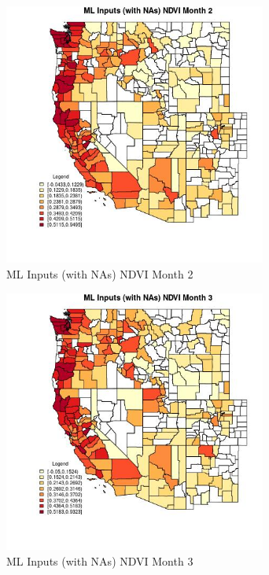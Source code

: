 \begin{figure} 
\centering  
\includegraphics[width=0.77\textwidth]{Code_Outputs/Report_ML_input_PM25_Step4_part_f_de_duplicated_aveswNAs_CountyNDVImedianMonth2.jpg} 
\caption{\label{fig:Report_ML_input_PM25_Step4_part_f_de_duplicated_aveswNAsCountyNDVImedianMonth2}ML Inputs (with NAs) NDVI Month 2} 
\end{figure} 
 

\begin{figure} 
\centering  
\includegraphics[width=0.77\textwidth]{Code_Outputs/Report_ML_input_PM25_Step4_part_f_de_duplicated_aveswNAs_CountyNDVImedianMonth3.jpg} 
\caption{\label{fig:Report_ML_input_PM25_Step4_part_f_de_duplicated_aveswNAsCountyNDVImedianMonth3}ML Inputs (with NAs) NDVI Month 3} 
\end{figure} 
 

